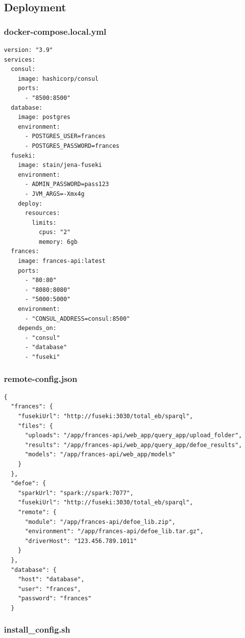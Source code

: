 \documentclass[12pt, letterpaper]{article}
\begin{document}
\subsection{Deployment}
\subsubsection{docker-compose.local.yml}\label{appendix:docker-compose.local.yml}

\begin{verbatim}
version: "3.9"
services:
  consul:
    image: hashicorp/consul
    ports:
      - "8500:8500"
  database:
    image: postgres
    environment:
      - POSTGRES_USER=frances
      - POSTGRES_PASSWORD=frances
  fuseki:
    image: stain/jena-fuseki
    environment:
      - ADMIN_PASSWORD=pass123
      - JVM_ARGS=-Xmx4g
    deploy:
      resources:
        limits:
          cpus: "2"
          memory: 6gb
  frances:
    image: frances-api:latest
    ports:
      - "80:80"
      - "8080:8080"
      - "5000:5000"
    environment:
      - "CONSUL_ADDRESS=consul:8500"
    depends_on:
      - "consul"
      - "database"
      - "fuseki"
\end{verbatim}

\subsubsection{remote-config.json}\label{appendix:deploy-remote-config.json}

\begin{verbatim}
{
  "frances": {
    "fusekiUrl": "http://fuseki:3030/total_eb/sparql",
    "files": {
      "uploads": "/app/frances-api/web_app/query_app/upload_folder",
      "results": "/app/frances-api/web_app/query_app/defoe_results",
      "models": "/app/frances-api/web_app/models"
    }
  },
  "defoe": {
    "sparkUrl": "spark://spark:7077",
    "fusekiUrl": "http://fuseki:3030/total_eb/sparql",
    "remote": {
      "module": "/app/frances-api/defoe_lib.zip",
      "environment": "/app/frances-api/defoe_lib.tar.gz",
      "driverHost": "123.456.789.1011"
    }
  },
  "database": {
    "host": "database",
    "user": "frances",
    "password": "frances"
  }
\end{verbatim}

\subsubsection{install\_config.sh}\label{appendix:deploy-install-config.sh}
\end{document}
